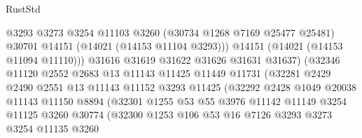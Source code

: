\begin{lexlean}{RustStd}
\begin{coremodule}
                                  @3293
                                  @3273
                                  @3254
                                  @11103
                                  @3260
                                  (@30734 @1268 @7169 @25477 @25481)
                                  @30701
                                  @14151
                                  (@14021 (@14153 @11104 @3293)))
                                @14151
                                (@14021 (@14153 @11094 @11110)))
                              @31616
                              @31619
                              @31622
                              @31626
                              @31631
                              @31637)
                            (@32346
                              @11120
                              @2552
                              @2683
                              @13
                              @11143
                              @11425
                              @11449
                              @11731
                              (@32281
                                @2429
                                @2490
                                @2551
                                @13
                                @11143
                                @11152
                                @3293
                                @11425
                                (@32292
                                  @2428
                                  @1049
                                  @20038
                                  @11143
                                  @11150
                                  @8894
                                  (@32301
                                    @1255
                                    @53
                                    @55
                                    @3976
                                    @11142
                                    @11149
                                    @3254
                                    @11125
                                    @3260
                                    @30774
                                    (@32300
                                      @1253
                                      @106
                                      @53
                                      @16
                                      @7126
                                      @3293
                                      @3273
                                      @3254
                                      @11135
                                      @3260

\end{coremodule}
\end{lexlean}
